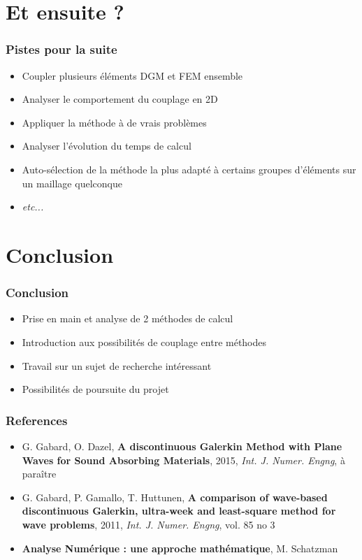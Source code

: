 \documentclass[10pt, compress]{beamer}
\begin{document}
\section{Et ensuite ?}

\begin{frame}
	\frametitle{Pistes pour la suite}

	\begin{itemize}
		\item Coupler plusieurs éléments DGM et FEM ensemble
		\item Analyser le comportement du couplage en 2D
		\item Appliquer la méthode à de vrais problèmes
		\item Analyser l'évolution du temps de calcul
		\item Auto-sélection de la méthode la plus adapté à certains groupes d'éléments sur un maillage quelconque
		\item \textit{etc...}
	\end{itemize}
\end{frame}

\section*{Conclusion}

\begin{frame}
	\frametitle{Conclusion}
	\begin{itemize}
		\item Prise en main et analyse de 2 méthodes de calcul
		\item Introduction aux possibilités de couplage entre méthodes
		\item Travail sur un sujet de recherche intéressant
		\item Possibilités de poursuite du projet
	\end{itemize}
\end{frame}

\begin{frame}
    \frametitle{References}

    \begin{itemize}
        \item  G. Gabard, O.  Dazel, \textbf{A discontinuous Galerkin Method with Plane Waves for Sound Absorbing
            Materials}, 2015, \textit{Int. J.  Numer. Engng}, à paraître
        \item  G. Gabard, P. Gamallo, T. Huttunen, \textbf{A comparison of wave-based discontinuous Galerkin, ultra-week
            and least-square method for wave problems}, 2011, \textit{Int. J.  Numer. Engng}, vol. 85 no 3
        \item \textbf{Analyse Numérique : une approche mathématique}, M. Schatzman
    \end{itemize}
\end{frame}

\end{document}
